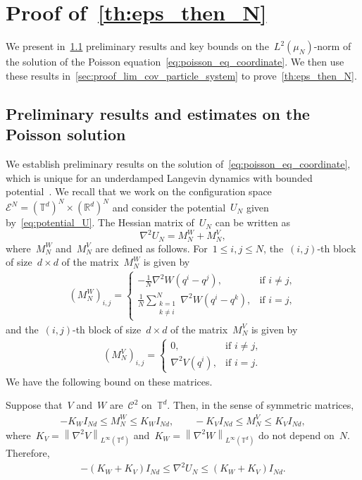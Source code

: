 \documentclass[onefignum,onetabnum]{siamart251216} %
\newcommand{\norm}[1]{\left\lVert#1\right\rVert}
\newcommand{\torus}{\mathbb T}
\newcommand{\real}{\mathbb R}
\newcommand{\mc}[1]{\mathcal{#1}}
\renewcommand{\leq}{\leqslant}
\newcommand{\mescin}{\mu}
\newcommand{\normT}[1]{\norm{#1}_{L^\infty(\torus^d)}}
\newcommand{\vq}[1]{q^{#1}}
\newcommand{\MNV}{M_N^V}
\newcommand{\MNW}{M_N^W}
\theoremstyle{plain}
\numberwithin{equation}{section}
\numberwithin{theorem}{section}
\begin{document}
\section{Proof of~\texorpdfstring{\cref{th:eps_then_N}}{Theorem~\ref{th:eps_then_N}}}
    \label{sec:lim_mat_system}
  We present in~\cref{sec:preli_poincare} preliminary results and key bounds on the~$L^2(\mescin_N)$-norm of the solution of the Poisson equation~\eqref{eq:poisson_eq_coordinate}. We then use these results in~\cref{sec:proof_lim_cov_particle_system} to prove~\cref{th:eps_then_N}.
\subsection{Preliminary results and estimates on the Poisson solution}
\label{sec:preli_poincare}
We establish preliminary results on the solution of~\eqref{eq:poisson_eq_coordinate}, which is unique for an underdamped Langevin dynamics with bounded potential~\cite[Theorem 1]{kozlov1989effective}.
We recall that we work on the configuration space~$\mc{E}^N = (\torus^d)^N \times (\real^d)^N$ and consider the potential~$U_N$ given by~\eqref{eq:potential_U}.
The Hessian matrix of~$U_N$ can be written as
\[
\nabla^2 U_N = \MNW + \MNV,
\]
where~$\MNW$ and~$\MNV$ are defined as follows.
For~$1 \leq i,j \leq N$, the~$(i,j)$-th block of size~$d \times d$ of the matrix~$\MNW$ is given by
\begin{align*}
    (\MNW)_{i,j} =
    \begin{cases}
        -\displaystyle\frac{1}{N} \displaystyle\nabla^2 W(\vq{i} - \vq{j}), & \text{if } i \neq j, \\
        \displaystyle\frac{1}{N} \displaystyle\sum_{\substack{k=1 \\ k \neq i}}^{N} \nabla^2 W(\vq{i} - \vq{k}), & \text{if } i = j,
    \end{cases}
\end{align*}
and the~$(i,j)$-th block of size~$d \times d$ of the matrix~$\MNV$ is given by
\begin{align*}
    (\MNV)_{i,j} =
    \begin{cases}
        0, & \text{if } i \neq j, \\
        \nabla^2 V(\vq{i}), & \text{if } i = j.
    \end{cases}
\end{align*}
We have the following bound on these matrices.
\begin{lemma}
    \label{lem:operator_norm_hessian}
    Suppose that~$V$ and~$W$ are~$\mc{C}^2$ on~$\torus^d$.
    Then, in the sense of symmetric matrices,
    \begin{align*}
        -K_W I_{Nd} \leq \MNW \leq K_W I_{Nd}, \qquad -K_V I_{Nd} \leq \MNV \leq K_V I_{Nd},
    \end{align*}
    where~$K_V = \normT{\nabla^2 V}$ and~$K_W = \normT{\nabla^2 W}$ do not depend on~$N$.
    Therefore,
    \begin{align}
        \label{eq:U_N_norm_sym_mat}
        -(K_W+K_V) I_{Nd} \leq \nabla^2 U_N \leq (K_W+K_V) I_{Nd}.
    \end{align}
\end{lemma}
\end{document}
